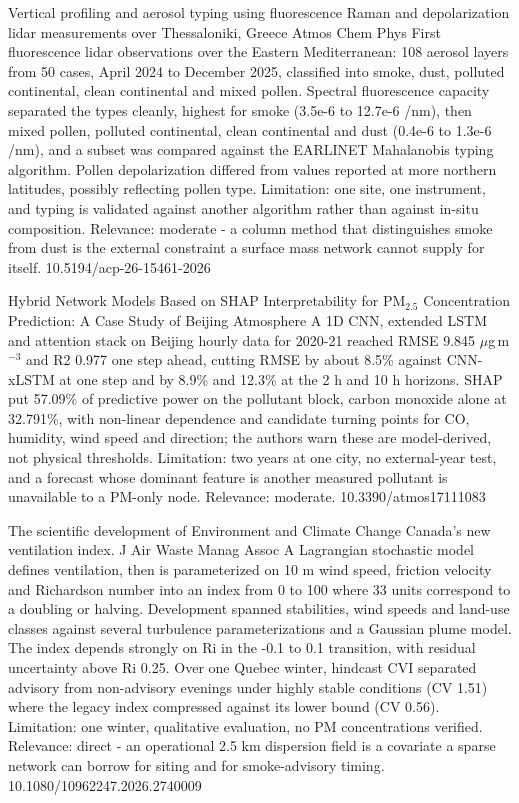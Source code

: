 \documentclass[10pt]{article}
\begin{document}
{Vertical profiling and aerosol typing using fluorescence Raman and depolarization lidar measurements over Thessaloniki, Greece}
{Atmos Chem Phys}
{First fluorescence lidar observations over the Eastern Mediterranean: 108 aerosol layers from 50 cases, April 2024 to December 2025, classified into smoke, dust, polluted continental, clean continental and mixed pollen. Spectral fluorescence capacity separated the types cleanly, highest for smoke (3.5e-6 to 12.7e-6 /nm), then mixed pollen, polluted continental, clean continental and dust (0.4e-6 to 1.3e-6 /nm), and a subset was compared against the EARLINET Mahalanobis typing algorithm. Pollen depolarization differed from values reported at more northern latitudes, possibly reflecting pollen type. Limitation: one site, one instrument, and typing is validated against another algorithm rather than against in-situ composition. Relevance: moderate - a column method that distinguishes smoke from dust is the external constraint a surface mass network cannot supply for itself.}
{10.5194/acp-26-15461-2026}

{Hybrid Network Models Based on SHAP Interpretability for PM$_{2.5}$ Concentration Prediction: A Case Study of Beijing}
{Atmosphere}
{A 1D CNN, extended LSTM and attention stack on Beijing hourly data for 2020-21 reached RMSE 9.845 $\mu$g\,m$^{-3}$ and R2 0.977 one step ahead, cutting RMSE by about 8.5\% against CNN-xLSTM at one step and by 8.9\% and 12.3\% at the 2 h and 10 h horizons. SHAP put 57.09\% of predictive power on the pollutant block, carbon monoxide alone at 32.791\%, with non-linear dependence and candidate turning points for CO, humidity, wind speed and direction; the authors warn these are model-derived, not physical thresholds. Limitation: two years at one city, no external-year test, and a forecast whose dominant feature is another measured pollutant is unavailable to a PM-only node. Relevance: moderate.}
{10.3390/atmos17111083}

{The scientific development of Environment and Climate Change Canada's new ventilation index.}
{J Air Waste Manag Assoc}
{A Lagrangian stochastic model defines ventilation, then is parameterized on 10 m wind speed, friction velocity and Richardson number into an index from 0 to 100 where 33 units correspond to a doubling or halving. Development spanned stabilities, wind speeds and land-use classes against several turbulence parameterizations and a Gaussian plume model. The index depends strongly on Ri in the -0.1 to 0.1 transition, with residual uncertainty above Ri 0.25. Over one Quebec winter, hindcast CVI separated advisory from non-advisory evenings under highly stable conditions (CV 1.51) where the legacy index compressed against its lower bound (CV 0.56). Limitation: one winter, qualitative evaluation, no PM concentrations verified. Relevance: direct - an operational 2.5 km dispersion field is a covariate a sparse network can borrow for siting and for smoke-advisory timing.}
{10.1080/10962247.2026.2740009}
\end{document}
